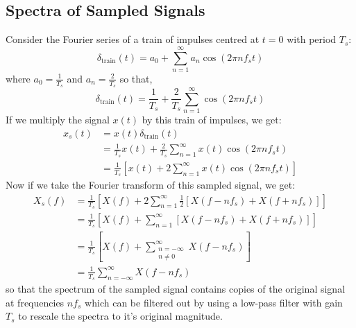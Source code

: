 \documentclass{article}
\begin{document}
\subsection{Spectra of Sampled Signals}
Consider the Fourier series of a train of impulses centred at \(t = 0\) with period \(T_s\):
\begin{equation*}
    \delta_{\mathrm{train}}\left( t \right) = a_0 + \sum_{n = 1}^{\infty} a_n \cos\left( 2\pi n f_s t \right)
\end{equation*}
where \(a_0 = \frac{1}{T_s}\) and \(a_n = \frac{2}{T_s}\) so that,
\begin{equation*}
    \delta_{\mathrm{train}}\left( t \right) = \frac{1}{T_s} + \frac{2}{T_s} \sum_{n = 1}^{\infty} \cos\left( 2\pi n f_s t \right)
\end{equation*}
If we multiply the signal \(x\left( t \right)\) by this train of impulses, we get:
\begin{align*}
    x_s\left( t \right) & = x\left( t \right) \delta_{\mathrm{train}}\left( t \right)                                                                  \\
                        & = \frac{1}{T_s} x\left( t \right) + \frac{2}{T_s} \sum_{n = 1}^{\infty} x\left( t \right) \cos\left( 2\pi n f_s t \right)    \\
                        & = \frac{1}{T_s} \left[ x\left( t \right) + 2 \sum_{n = 1}^{\infty} x\left( t \right) \cos\left( 2\pi n f_s t \right) \right]
\end{align*}
Now if we take the Fourier transform of this sampled signal, we get:
\begin{align*}
    X_s\left( f \right) & = \frac{1}{T_s} \left[ X\left( f \right) + 2 \sum_{n = 1}^\infty \frac{1}{2}\left[ X\left( f - nf_s \right) + X\left( f + nf_s \right) \right] \right] \\
                        & = \frac{1}{T_s} \left[ X\left( f \right) + \sum_{n = 1}^\infty \left[ X\left( f - nf_s \right) + X\left( f + nf_s \right) \right] \right]              \\
                        & = \frac{1}{T_s} \left[ X\left( f \right) + \sum_{\substack{n = -\infty                                                                                 \\ n \neq 0}}^\infty X\left( f - nf_s \right) \right]              \\
                        & = \frac{1}{T_s} \sum_{n = -\infty}^\infty X\left( f - nf_s \right)
\end{align*}
so that the spectrum of the sampled signal contains copies of the original signal at frequencies
\(n f_s\) which can be filtered out by using a low-pass filter with gain \(T_s\) to rescale the spectra to it's original magnitude.
\end{document}
